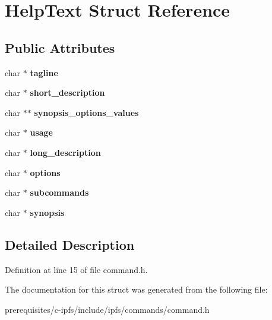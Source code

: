 \hypertarget{struct_help_text}{}\section{Help\+Text Struct Reference}
\label{struct_help_text}
\subsection*{Public Attributes}
\begin{DoxyCompactItemize}
\item 
\mbox{\label{struct_help_text_a3af747002459db0a3ad7320d6a3895ca}} 
char $\ast$ {\bfseries tagline}
\item 
\mbox{\label{struct_help_text_a2235afb10c30179cc04399f4386ca5df}} 
char $\ast$ {\bfseries short\+\_\+description}
\item 
\mbox{\label{struct_help_text_abffe932db91f81691dca9edfaaa81570}} 
char $\ast$$\ast$ {\bfseries synopsis\+\_\+options\+\_\+values}
\item 
\mbox{\label{struct_help_text_a6a150af8a466d08dd9f806ab2312543a}} 
char $\ast$ {\bfseries usage}
\item 
\mbox{\label{struct_help_text_aac00b3f29261b7f4d7017442dc2721b0}} 
char $\ast$ {\bfseries long\+\_\+description}
\item 
\mbox{\label{struct_help_text_a78f327b4e299159119b21ffd172af1cf}} 
char $\ast$ {\bfseries options}
\item 
\mbox{\label{struct_help_text_a53cad908c2fde931caae61cecef4e453}} 
char $\ast$ {\bfseries subcommands}
\item 
\mbox{\label{struct_help_text_a097bc95da20a332c7b09406f653c264e}} 
char $\ast$ {\bfseries synopsis}
\end{DoxyCompactItemize}


\subsection{Detailed Description}


Definition at line 15 of file command.\+h.



The documentation for this struct was generated from the following file\+:\begin{DoxyCompactItemize}
\item 
prerequisites/c-\/ipfs/include/ipfs/commands/command.\+h\end{DoxyCompactItemize}
